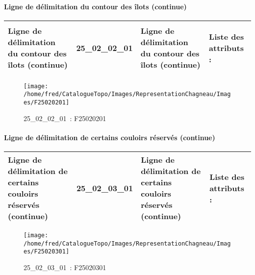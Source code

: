 \documentclass[12pt,titlepage,oneside]{book}
\begin{document}
\paragraph{Ligne de délimitation du contour des îlots (continue)}
\noindent
\vspace{\baselineskip}

\renewcommand{\arraystretch}{1.2}
\begin{supertabular}{|p{10cm}|c|p{13cm}|p{12cm}|}
 Ligne de délimitation du contour des îlots (continue) & 25\_02\_02\_01 & Ligne de délimitation du contour des îlots (continue) & Liste des attributs :
\begin{enumerate}
\end{enumerate}
\\
\hline
\end{supertabular}
\begin{figure}[h!]
  \hfill         %
  \begin{minipage}[t]{3cm}
    \begin{center}
      \texttt{[image: /home/fred/CatalogueTopo/Images/RepresentationChagneau/Images/F25020201]}
      \caption[~25\_02\_02\_01]{\small{25\_02\_02\_01~:} \tiny{F25020201}}\label{F25020201}
    \end{center}
  \end{minipage}
\end{figure}


\paragraph{Ligne de délimitation de certains couloirs réservés (continue)}
\noindent
\vspace{\baselineskip}

\renewcommand{\arraystretch}{1.2}
\begin{supertabular}{|p{10cm}|c|p{13cm}|p{12cm}|}
 Ligne de délimitation de certains couloirs réservés (continue) & 25\_02\_03\_01 & Ligne de délimitation de certains couloirs réservés (continue) & Liste des attributs :
\begin{enumerate}
\end{enumerate}
\\
\hline
\end{supertabular}
\begin{figure}[h!]
  \hfill         %
  \begin{minipage}[t]{3cm}
    \begin{center}
      \texttt{[image: /home/fred/CatalogueTopo/Images/RepresentationChagneau/Images/F25020301]}
      \caption[~25\_02\_03\_01]{\small{25\_02\_03\_01~:} \tiny{F25020301}}\label{F25020301}
    \end{center}
  \end{minipage}
\end{figure}
\end{document}
